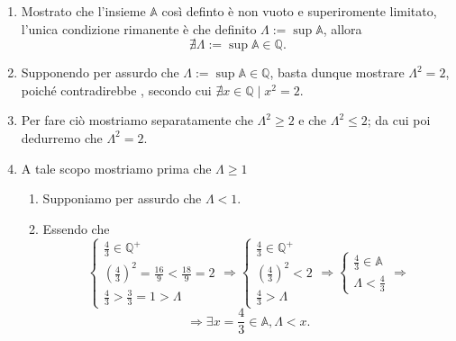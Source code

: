 \begin{enumerate}
\begin{demonstration}
\begin{enumerate}[label=(\roman*)]
            \item Mostrato che l'insieme $\mathbb{A}$ così definto è non vuoto e superiromente limitato,
            l'unica condizione rimanente è che definito $\Lambda := \sup\mathbb{A}$, allora
            \[ \nexists \Lambda := \sup\mathbb{A} \in \mathbb{Q}.\]

            \item Supponendo per assurdo che $\Lambda := \sup\mathbb{A} \in\mathbb{Q}$, basta dunque mostrare $\Lambda^2 = 2$,
            poiché contradirebbe , secondo cui $\nexists x\in\mathbb{Q} \mid x^2 = 2$.

            \item Per fare ciò mostriamo separatamente che $\Lambda^2 \geq 2$ e che $\Lambda^2 \leq 2$; da cui
            poi dedurremo che $\Lambda^2 = 2$.\

            \item \label{pas:lam-mag-zer} A tale scopo mostriamo prima che $\Lambda \geq 1$
            
            \begin{enumerate}[label=\arabic*.]
            
                \item Supponiamo per assurdo che $\Lambda < 1$.
                \item Essendo che
                \[
                    \begin{cases}
                        \frac{4}{3}\in\mathbb{Q}^+ \\
                        \left(\frac{4}{3}\right)^2 = \frac{16}{9} < \frac{18}{9} = 2\\
                        \frac{4}{3} > \frac{3}{3} = 1 > \Lambda
                    \end{cases}\Rightarrow
                    \begin{cases}
                        \frac{4}{3}\in\mathbb{Q}^+ \\
                        \left(\frac{4}{3}\right)^2 < 2\\
                        \frac{4}{3} > \Lambda
                    \end{cases}\Rightarrow
                    \begin{cases}
                        \frac{4}{3}\in\mathbb{A}\\
                        \Lambda < \frac{4}{3}
                    \end{cases} \Rightarrow
                \]
                \[\Rightarrow
                        \exists x = \frac{4}{3}\in\mathbb{A}, \Lambda < x. \]\[
                \]


\end{enumerate}
\end{enumerate}
\end{demonstration}
\end{enumerate}
